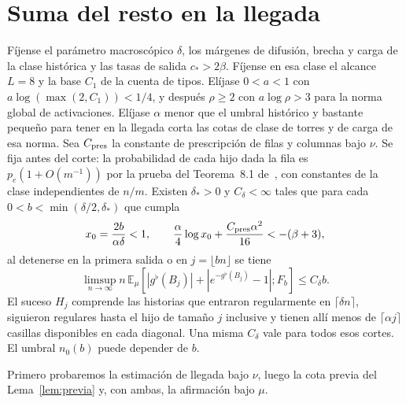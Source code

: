 \section{Suma del resto en la llegada}\label{app:arrival}
\begin{lema}\label{lem:llegada-integrada}
Fíjense el parámetro macroscópico \(\delta\), los márgenes de difusión, brecha y carga de la
clase histórica y las tasas de salida \(c_*>2\beta\). Fíjense en esa clase el alcance \(L=8\)
y la base \(C_1\) de la cuenta de tipos. Elíjase \(0<a<1\) con
\(a\log(\max(2,C_1))<1/4\), y después \(\rho\ge2\) con \(a\log\rho>3\)
para la norma global de activaciones.
Elíjase \(\alpha\) menor que el umbral histórico y bastante pequeño para tener en la llegada
corta las cotas de clase de torres y de carga de esa norma. Sea \(C_{\rm pres}\) la constante
de prescripción de filas y columnas bajo \(\nu\). Se fija antes del corte: la probabilidad de
cada hijo dada la fila es \(p_e(1+O(m^{-1}))\) por la prueba del Teorema~8.1 de~\cite{pc},
con constantes de la clase independientes de \(n/m\).
Existen \(\delta_*>0\) y \(C_\delta<\infty\) tales que para cada \(0<b<\min(\delta/2,\delta_*)\)
que cumpla
\[
 x_0=\frac{2b}{\alpha\delta}<1,\qquad
 \frac{\alpha}{4}\log x_0+\frac{C_{\rm pres}\alpha^2}{16}<-(\beta+3),
\]
al detenerse en la primera salida o en \(j=\lfloor bn\rfloor\) se tiene
\begin{equation}\label{eq:arrival-estimate}
 \limsup_{n\to\infty} n\,\mathbb E_\mu
  [|g^\flat(B_j)|+|e^{-g^\flat(B_j)}-1|;F_b]\le C_\delta b .
\end{equation}
El suceso \(H_j\) comprende las historias que entraron regularmente en \(\lceil\delta n\rceil\),
siguieron regulares hasta el hijo de tamaño \(j\) inclusive y tienen allí menos de
\(\lceil\alpha j\rceil\) casillas disponibles en cada diagonal. Una misma \(C_\delta\)
vale para todos esos cortes. El umbral \(n_0(b)\) puede depender de \(b\).
\end{lema}
Primero probaremos la estimación de llegada bajo \(\nu\), luego la cota previa
del Lema~\ref{lem:previa} y, con ambas, la afirmación bajo \(\mu\).





